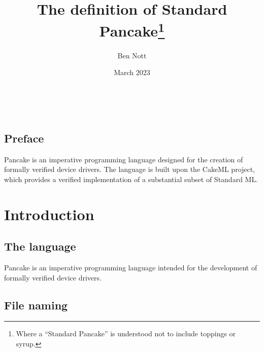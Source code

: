 \documentclass[a4paper]{amsbook}
\begin{document}
~

\title{The definition of Standard Pancake\footnote{Where a ``Standard Pancake'' is understood not to include toppings or syrup.}}

\date{March 2023}

\author[bnott]{Ben Nott}  \address{UNSW, Sydney}


\maketitle

\frontmatter

\section*{Preface}
\label{sec:preface}

Pancake is an imperative programming language designed for the creation of formally verified device drivers. The language is built upon the CakeML project, which provides a verified implementation of a substantial subset of Standard ML.

\tableofcontents
\setcounter{secnumdepth}{1}
\setcounter{secnumdepth}{0}

\mainmatter

\chapter{Introduction}
\label{cha:introduction}

\section{The language}
\label{sec:language}

Pancake is an imperative programming language intended for the development of formally verified device drivers.

\section{File naming}
\label{sec:file-naming}
\end{document}

